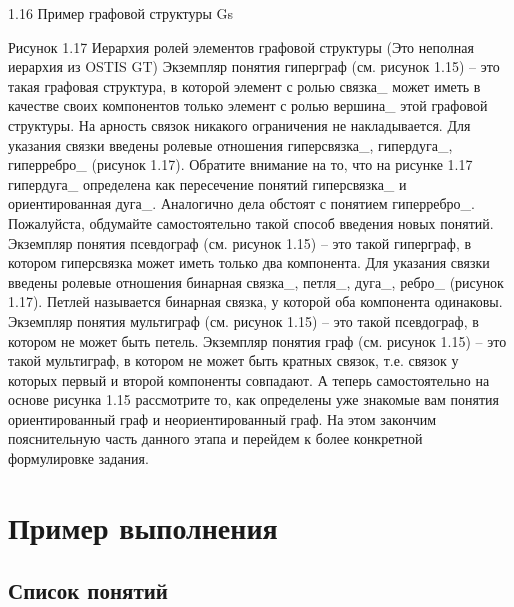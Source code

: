 1.16 Пример графовой структуры Gs
 
Рисунок 1.17 Иерархия ролей элементов графовой структуры (Это неполная иерархия из OSTIS GT)
Экземпляр понятия гиперграф (см. рисунок 1.15) – это такая графовая структура, в которой элемент с ролью связка_ может иметь в качестве своих компонентов только элемент с ролью вершина_ этой графовой структуры.  На арность связок никакого ограничения не накладывается. Для указания связки введены ролевые отношения гиперсвязка_, гипердуга_, гиперребро_ (рисунок 1.17). Обратите внимание на то, что на рисунке 1.17 гипердуга_ определена как пересечение понятий гиперсвязка_ и ориентированная дуга_. Аналогично дела обстоят с понятием гиперребро_. Пожалуйста, обдумайте самостоятельно такой способ введения новых понятий.
Экземпляр понятия псевдограф (см. рисунок 1.15) – это такой гиперграф, в котором гиперсвязка может иметь только два компонента.  Для указания связки введены ролевые отношения бинарная связка_, петля_, дуга_, ребро_ (рисунок 1.17). Петлей называется бинарная связка, у которой оба компонента одинаковы.
Экземпляр понятия мультиграф (см. рисунок 1.15) – это такой псевдограф, в котором не может быть петель. 
Экземпляр понятия граф (см. рисунок 1.15) – это такой мультиграф, в котором не может быть кратных связок, т.е. связок у которых первый и второй компоненты совпадают. 
А теперь самостоятельно на основе рисунка 1.15 рассмотрите то, как определены уже знакомые вам понятия ориентированный граф и неориентированный граф. На этом закончим пояснительную часть данного этапа и перейдем к более конкретной формулировке задания. 

\section{Пример выполнения}

\subsection{Список понятий}

